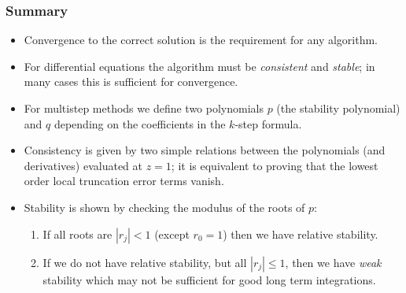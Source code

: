 \documentclass{beamer}
\begin{document}
\begin{frame}
  \frametitle{Summary}

  \begin{itemize}
  \item Convergence to the correct solution is the requirement for any
    algorithm.
  \item For differential equations the algorithm must be
    \emph{consistent} and \emph{stable}; in many cases this is
    sufficient for convergence.
  \item For multistep methods we define two polynomials $p$ (the
    stability polynomial) and $q$ depending on the coefficients in the
    $k$-step formula.
  \item Consistency is given by two simple relations between the
    polynomials (and derivatives) evaluated at $z=1$; it is equivalent
    to proving that the lowest order local truncation error terms
    vanish.
  \item Stability is shown by checking the modulus of the roots of $p$:
    \begin{enumerate}
    \item If all roots are $|r_j|<1$ (except $r_0=1$) then we have
      relative stability.
    \item If we do not have relative stability, but all $|r_j| \leq
      1$, then we have \emph{weak} stability which may not be
      sufficient for good long term integrations.
    \end{enumerate}
  \end{itemize}

\end{frame}
\end{document}
